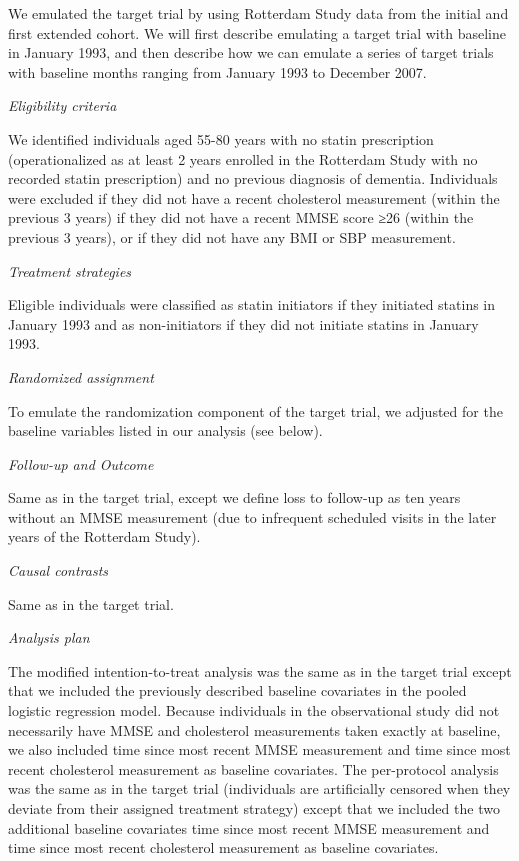 \documentclass[
]{book}
\begin{document}
We emulated the target trial by using Rotterdam Study data from the initial and first extended cohort. We will first describe emulating a target trial with baseline in January 1993, and then describe how we can emulate a series of target trials with baseline months ranging from January 1993 to December 2007.

\emph{Eligibility criteria}

We identified individuals aged 55-80 years with no statin prescription (operationalized as at least 2 years enrolled in the Rotterdam Study with no recorded statin prescription) and no previous diagnosis of dementia. Individuals were excluded if they did not have a recent cholesterol measurement (within the previous 3 years) if they did not have a recent MMSE score ≥26 (within the previous 3 years), or if they did not have any BMI or SBP measurement.

\emph{Treatment strategies}

Eligible individuals were classified as statin initiators if they initiated statins in January 1993 and as non-initiators if they did not initiate statins in January 1993.

\emph{Randomized assignment}

To emulate the randomization component of the target trial, we adjusted for the baseline variables listed in our analysis (see below).

\emph{Follow-up and Outcome}

Same as in the target trial, except we define loss to follow-up as ten years without an MMSE measurement (due to infrequent scheduled visits in the later years of the Rotterdam Study).

\emph{Causal contrasts}

Same as in the target trial.

\emph{Analysis plan}

The modified intention-to-treat analysis was the same as in the target trial except that we included the previously described baseline covariates in the pooled logistic regression model. Because individuals in the observational study did not necessarily have MMSE and cholesterol measurements taken exactly at baseline, we also included time since most recent MMSE measurement and time since most recent cholesterol measurement as baseline covariates. The per-protocol analysis was the same as in the target trial (individuals are artificially censored when they deviate from their assigned treatment strategy) except that we included the two additional baseline covariates time since most recent MMSE measurement and time since most recent cholesterol measurement as baseline covariates.
\end{document}
